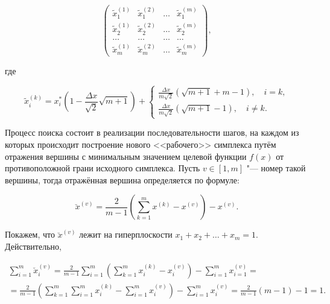 $$

\begin{pmatrix}

\tilde{x}_1^{(1)} & \tilde{x}_1^{(2)} & \dots & \tilde{x}_1^{(m)} \\

\tilde{x}_2^{(1)} & \tilde{x}_2^{(2)} & \dots & \tilde{x}_2^{(m)} \\

\dots & \dots & \dots & \dots \\

\tilde{x}_m^{(1)} & \tilde{x}_m^{(2)} & \dots & \tilde{x}_m^{(m)}

\end{pmatrix},

$$

где

$$

\tilde{x}_i^{(k)}=x_i^\ast\left(1-\frac{\Delta x}{\sqrt2}\sqrt{m+1}\right)+

\left\{\begin{array}{l}

\frac{\Delta x}{m\sqrt2}(\sqrt{m+1}+m-1),\quad i = k, 

\\

\frac{\Delta x}{m\sqrt2}(\sqrt{m+1}-1), \quad i\ne k.

\end{array}\right.

$$



Процесс поиска состоит в реализации последовательности шагов, на каждом из которых происходит построение нового <<рабочего>> симплекса путём отражения вершины с минимальным значением целевой функции $f(x)$ от противоположной грани исходного симплекса. Пусть $v\in[1,m]$ "--- номер такой вершины, тогда отражённая вершина определяется по формуле:

$$

\breve{x}^{(v)}=\frac{2}{m-1}\left(\sum\limits_{k=1}^m {x^{(k)}-x^{(v)}}\right)-x^{(v)}.

$$



Покажем, что $\breve{x}^{(v)}$ лежит на гиперплоскости $x_1+x_2+\dots+x_m=1$. Действительно,

\begin{multline*}

\sum\limits_{i=1}^m \breve{x}_i^{(v)}=\frac{2}{m-1}\sum\limits_{i=1}^m\left(\sum\limits_{k=1}^mx_i^{(k)}-x_i^{(v)}\right)-\sum\limits_{i=1}^m x_{i=1}^{(v)}= 

\\

=\frac{2}{m-1}\left(\sum\limits_{k=1}^m\sum\limits_{i=1}^m x_i^{(k)}-\sum\limits_{i=1}^m x_i^{(v)}\right)-\sum\limits_{i=1}^m x_i^{(v)}=\frac{2}{m-1}(m-1)-1=1.

\end{multline*}



